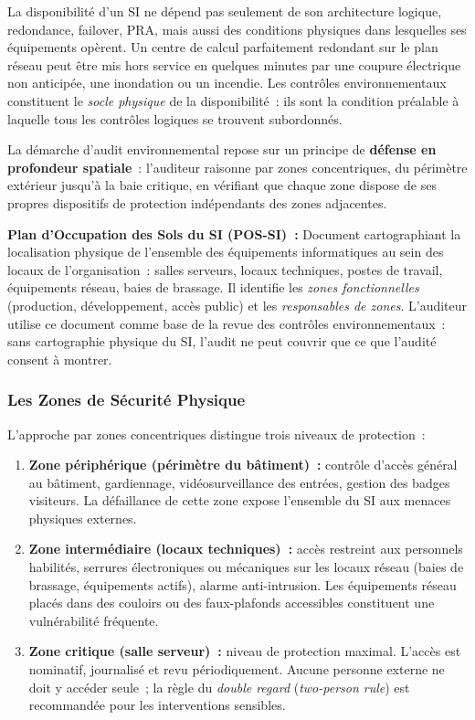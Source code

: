La disponibilité d'un SI ne dépend pas seulement de son architecture logique,
redondance, failover, PRA, mais aussi des conditions physiques dans lesquelles ses
équipements opèrent. Un centre de calcul parfaitement redondant sur le plan réseau
peut être mis hors service en quelques minutes par une coupure électrique non
anticipée, une inondation ou un incendie. Les contrôles environnementaux constituent
le \emph{socle physique} de la disponibilité~: ils sont la condition préalable à
laquelle tous les contrôles logiques se trouvent subordonnés.

La démarche d'audit environnemental repose sur un principe de
\textbf{défense en profondeur spatiale}~: l'auditeur raisonne par zones concentriques,
du périmètre extérieur jusqu'à la baie critique, en vérifiant que chaque zone dispose
de ses propres dispositifs de protection indépendants des zones adjacentes.

\begin{boxdef}
\textbf{Plan d'Occupation des Sols du SI (POS-SI)~:}
Document cartographiant la localisation physique de l'ensemble des équipements
informatiques au sein des locaux de l'organisation~: salles serveurs, locaux techniques,
postes de travail, équipements réseau, baies de brassage. Il identifie les
\emph{zones fonctionnelles} (production, développement, accès public) et les
\emph{responsables de zones}. L'auditeur utilise ce document comme base de la revue
des contrôles environnementaux~: sans cartographie physique du SI, l'audit ne peut
couvrir que ce que l'audité consent à montrer.
\end{boxdef}

\subsubsection{Les Zones de Sécurité Physique}

L'approche par zones concentriques distingue trois niveaux de protection~:

\begin{enumerate}
    \item \textbf{Zone périphérique (périmètre du bâtiment)~:} contrôle d'accès
        général au bâtiment, gardiennage, vidéosurveillance des entrées, gestion
        des badges visiteurs. La défaillance de cette zone expose l'ensemble du SI
        aux menaces physiques externes.
    \item \textbf{Zone intermédiaire (locaux techniques)~:} accès restreint aux
        personnels habilités, serrures électroniques ou mécaniques sur les locaux
        réseau (baies de brassage, équipements actifs), alarme anti-intrusion. Les
        équipements réseau placés dans des couloirs ou des faux-plafonds accessibles
        constituent une vulnérabilité fréquente.
    \item \textbf{Zone critique (salle serveur)~:} niveau de protection maximal.
        L'accès est nominatif, journalisé et revu périodiquement. Aucune personne
        externe ne doit y accéder seule~; la règle du \emph{double regard}
        (\textit{two-person rule}) est recommandée pour les interventions sensibles.
\end{enumerate}

